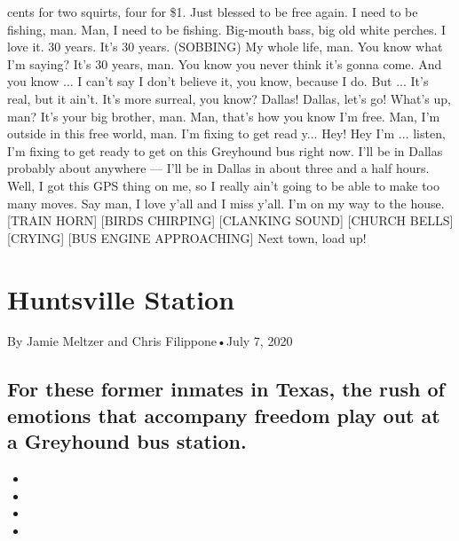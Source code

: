 \begin{itemize}
  cents for two squirts, four for \$1. Just blessed to be free again. I
  need to be fishing, man. Man, I need to be fishing. Big-mouth bass,
  big old white perches. I love it. 30 years. It's 30 years. (SOBBING)
  My whole life, man. You know what I'm saying? It's 30 years, man. You
  know you never think it's gonna come. And you know ... I can't say I
  don't believe it, you know, because I do. But ... It's real, but it
  ain't. It's more surreal, you know? Dallas! Dallas, let's go! What's
  up, man? It's your big brother, man. Man, that's how you know I'm
  free. Man, I'm outside in this free world, man. I'm fixing to get read
  y... Hey! Hey I'm ... listen, I'm fixing to get ready to get on this
  Greyhound bus right now. I'll be in Dallas probably about anywhere ---
  I'll be in Dallas in about three and a half hours. Well, I got this
  GPS thing on me, so I really ain't going to be able to make too many
  moves. Say man, I love y'all and I miss y'all. I'm on my way to the
  house. {[}TRAIN HORN{]} {[}BIRDS CHIRPING{]} {[}CLANKING SOUND{]}
  {[}CHURCH BELLS{]} {[}CRYING{]} {[}BUS ENGINE APPROACHING{]} Next
  town, load up!
\end{itemize}

\hypertarget{huntsville-station-1}{%
\section{Huntsville Station}\label{huntsville-station-1}}

By Jamie Meltzer and Chris Filippone•July 7, 2020

\hypertarget{for-these-former-inmates-in-texas-the-rush-of-emotions-that-accompany-freedom-play-out-at-a-greyhound-bus-station-1}{%
\subsection{For these former inmates in Texas, the rush of emotions that
accompany freedom play out at a Greyhound bus
station.}\label{for-these-former-inmates-in-texas-the-rush-of-emotions-that-accompany-freedom-play-out-at-a-greyhound-bus-station-1}}

\begin{itemize}
\item
\item
\item
\item
\end{itemize}

